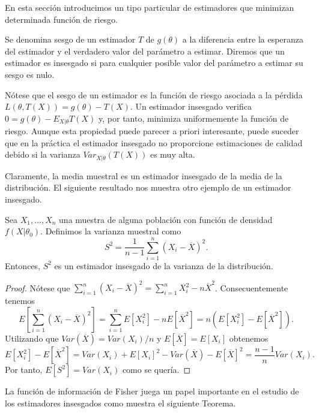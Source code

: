 \documentclass{article}
\begin{document}
    En esta sección introducimos un tipo particular de estimadores que minimizan determinada función de riesgo.

    \begin{definition}
        Se denomina sesgo de un estimador $T$ de $g(\theta)$ a la diferencia entre la esperanza del estimador y el verdadero valor del parámetro a estimar. Diremos que un estimador es insesgado si para cualquier posible valor del parámetro a estimar su sesgo es nulo.
    \end{definition}

    Nótese que el sesgo de un estimador es la función de riesgo asociada a la pérdida $L(\theta,T(X)) = g(\theta) - T(X)$. Un estimador insesgado verifica $0 = g(\theta) - E_{X|\theta} T(X)$ y, por tanto, minimiza uniformemente la función de riesgo. Aunque esta propiedad puede parecer a priori interesante, puede suceder que en la práctica el estimador insesgado no proporcione estimaciones de calidad debido si la varianza $Var_{X|\theta}(T(X))$ es muy alta.

    Claramente, la media muestral es un estimador insesgado de la media de la distribución. El siguiente resultado nos muestra otro ejemplo de un estimador insesgado.

    \begin{prop}
        Sea $X_1, \ldots, X_n$ una muestra de alguna población con función de densidad $f(X | \theta_0)$. Definimos la varianza muestral como
        \[S^2 = \frac{1}{n-1}\sum_{i = 1}^n(X_i - \overline{X})^2.\]
        Entonces, $S^2$ es un estimador insesgado de la varianza de la distribución.
    \end{prop}
    \begin{proof}
        Nótese que $\sum_{i = 1}^n(X_i - \overline{X})^2 = \sum_{i = 1}^nX_i^2 - n\overline{X}^2$. Consecuentemente tenemos
        \[E\left[\sum_{i = 1}^n(X_i - \overline{X})^2\right] = \sum_{i = 1}^nE\left[X_i^2\right] -     nE[\overline{X}^2] = n(E\left[X_i^2\right] - E[\overline{X}^2]).\]
        Utilizando que $Var(\overline{X}) = Var(X_i) / n$ y $E[\overline{X}] = E[X_i]$ obtenemos
        \[E[X_i^2] - E[\overline{X}^2] = Var(X_i) + E[X_i]^2 - Var(\overline{X}) - E[\overline{X}]^2 = \frac{n-1}{n} Var(X_i).\]
        Por tanto, $E[S^2] = Var(X_i)$ como se quería.
    \end{proof}

    La función de información de Fisher juega un papel importante en el estudio de los estimadores insesgados como muestra el siguiente Teorema.
\end{document}
